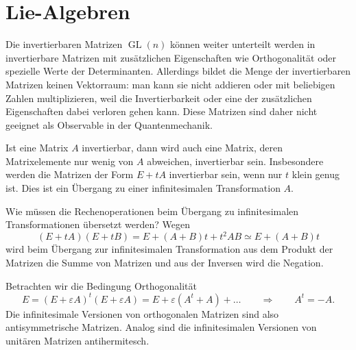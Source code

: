 %
%
\section{Lie-Algebren}
Die invertierbaren Matrizen $\operatorname{GL}(n)$ können weiter
unterteilt werden in invertierbare Matrizen mit zusätzlichen
Eigenschaften wie Orthogonalität oder spezielle Werte der Determinanten.
Allerdings bildet die Menge der invertierbaren Matrizen keinen
Vektorraum: man kann sie nicht addieren oder mit beliebigen Zahlen
multiplizieren, weil die Invertierbarkeit oder eine der zusätzlichen
Eigenschaften dabei verloren gehen kann. Diese Matrizen sind 
daher nicht geeignet als Observable in der Quantenmechanik.

Ist eine Matrix $A$ invertierbar, dann wird auch eine Matrix, deren
Matrixelemente nur wenig von $A$ abweichen, invertierbar sein.
Insbesondere werden die Matrizen der Form $E+tA$ invertierbar sein,
wenn nur $t$ klein genug ist. Dies ist ein Übergang zu einer 
infinitesimalen Transformation $A$.

Wie müssen die Rechenoperationen beim Übergang zu infinitesimalen
Transformationen übersetzt werden?
Wegen
\[
(E+tA)(E+tB)=E+(A+B)t + t^2AB\simeq E+(A+B)t
\]
wird beim Übergang zur infinitesimalen Transformation aus dem Produkt
der Matrizen die Summe von Matrizen und aus der Inversen wird die Negation.

Betrachten wir die Bedingung Orthogonalität
\[
E=
(E+\varepsilon A)^t(E+\varepsilon A)
=
E+\varepsilon (A^t+A) + \dots
\qquad
\Rightarrow
\qquad
A^t=-A.
\]
Die infinitesimale Versionen von orthogonalen Matrizen sind also
antisymmetrische Matrizen.
Analog sind die infinitesimalen Versionen von unitären Matrizen
antihermitesch.

